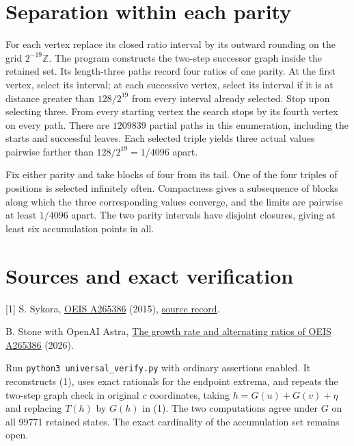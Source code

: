 \documentclass[11pt,letterpaper]{article}
\begin{document}
\section*{Separation within each parity}
For each vertex replace its closed ratio interval by its outward rounding on the grid $2^{-19}\mathbb Z$. The program constructs the two-step successor graph inside the retained set. Its length-three paths record four ratios of one parity. At the first vertex, select its interval; at each successive vertex, select its interval if it is at distance greater than $128/2^{19}$ from every interval already selected. Stop upon selecting three. From every starting vertex the search stops by its fourth vertex on every path. There are $1209839$ partial paths in this enumeration, including the starts and successful leaves. Each selected triple yields three actual values pairwise farther than $128/2^{19}=1/4096$ apart.

Fix either parity and take blocks of four from its tail. One of the four triples of positions is selected infinitely often. Compactness gives a subsequence of blocks along which the three corresponding values converge, and the limits are pairwise at least $1/4096$ apart. The two parity intervals have disjoint closures, giving at least six accumulation points in all.

\section*{Sources and exact verification}
\small
[1] S. Sykora, \href{https://oeis.org/A265386}{OEIS A265386} (2015), \href{https://github.com/oeis/oeisdata/blob/main/seq/A265/A265386.seq}{source record}.\par
[2] B. Stone with OpenAI Astra, \href{https://github.com/blakestone-x/math/blob/c18014b822980b0d6cb9b78fc228e5efda2718c6/A265386/A265386_proof.pdf}{The growth rate and alternating ratios of OEIS A265386} (2026).\par
Run \texttt{python3 universal\_verify.py} with ordinary assertions enabled. It reconstructs (1), uses exact rationals for the endpoint extrema, and repeats the two-step graph check in original $c$ coordinates, taking $h=G(u)+G(v)+\eta$ and replacing $T(h)$ by $G(h)$ in (1). The two computations agree under $G$ on all 99771 retained states. The exact cardinality of the accumulation set remains open.
\end{document}
